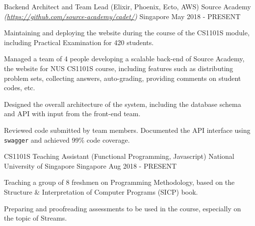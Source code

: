 \begin{cventries}
	\cventry
		{Backend Architect and Team Lead (Elixir, Phoenix, Ecto, AWS)} %
		{Source Academy \textmd{\em\tiny(\url{https://github.com/source-academy/cadet/})}} %
		{Singapore} %
		{May 2018 - PRESENT} %
		{
			\begin{cvitems}
				\item {Maintaining and deploying the website during the course of the CS1101S module, including Practical Examination for 420 students.}
				\item {Managed a team of 4 people developing a scalable back-end of Source Academy, the website for NUS CS1101S course, including features such as distributing problem sets, collecting answers, auto-grading, providing comments on student codes, etc.}
				\item {Designed the overall architecture of the system, including the database schema and API with input from the front-end team.}
				\item {Reviewed code submitted by team members. Documented the API interface using \texttt{swagger} and achieved 99\% code coverage.}
			\end{cvitems}
		}
	\cventry
		{CS1101S Teaching Assistant (Functional Programming, Javascript)} %
		{National University of Singapore} %
		{Singapore} %
		{Aug 2018 - PRESENT} %
		{
			\begin{cvitems}
				\item {Teaching a group of 8 freshmen on Programming Methodology, based on the Structure \& Interpretation of Computer Programs (SICP) book.}
				\item {Preparing and proofreading assessments to be used in the course, especially on the topic of Streams.}
			\end{cvitems}
		}

\end{cventries}
